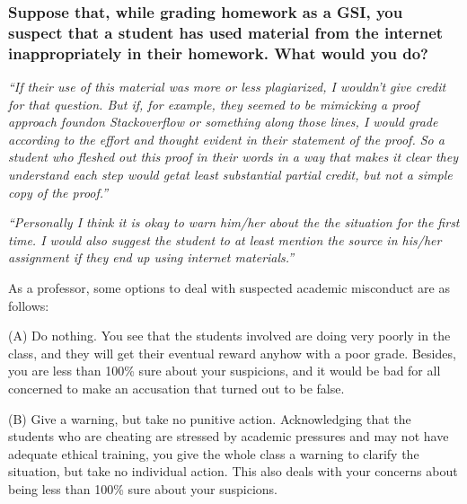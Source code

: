 \documentclass[12pt]{beamer}
\newcommand\ans[1]{{\it ``#1''}}
\begin{document}
\begin{frame} %

\frametitle{Suppose that, while grading homework as a GSI, you suspect that a student has used material from the internet inappropriately in their homework. What would you do?}

\ans{If their use of this material was more or less plagiarized, I wouldn’t give credit for that question.  But if, for example, they seemed to be mimicking a proof approach foundon Stackoverflow or something along those lines, I would grade according to the effort and thought evident in their statement of the proof.  So a student who fleshed out this proof in their words in a way that makes it clear they understand each step would getat least substantial partial credit, but not a simple copy of the proof.}

\end{frame}
\begin{frame}
  
\ans{Personally I think it is okay to warn him/her about the the situation for the first time. I would also suggest the student to at least mention the source in his/her assignment if they end up using internet materials.}



\end{frame}
\begin{frame}

As a professor, some options to deal with suspected academic misconduct are as follows:

(A) Do nothing. You see that the students involved are doing very poorly in the class, and they will get their eventual reward anyhow with a poor grade. Besides, you are less than 100\% sure about your suspicions, and it would be bad for all concerned to make an accusation that turned out to be false.

(B) Give a warning, but take no punitive action. Acknowledging that the students who are cheating are stressed by academic pressures and may not have adequate ethical training, you give the whole class a warning to clarify the situation, but take no individual action. This also deals with your concerns about being less than  100\% sure about your suspicions.

\end{frame}
\end{document}
